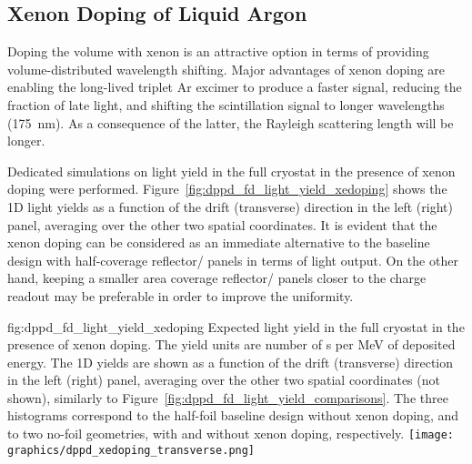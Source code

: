 \subsection{Xenon Doping of Liquid Argon}
\label{sec:dp-pds-appendix-xedoping}

Doping the  volume with xenon is an attractive option in terms of providing %
volume-distributed wavelength shifting. Major advantages of xenon doping are enabling the long-lived triplet Ar excimer to produce a faster signal, reducing the fraction of late light, and shifting the scintillation signal to longer wavelengths (\SI{175}{nm}). As a consequence of the latter, the Rayleigh scattering length will be longer.

Dedicated simulations on light yield in the full  cryostat in the presence of xenon doping were performed. Figure~\ref{fig:dppd_fd_light_yield_xedoping} shows the 1D light yields as a function of the drift (transverse) direction in the left (right) panel, averaging over the other two spatial coordinates. It is evident that the xenon doping can be considered as an immediate alternative to the baseline design with half-coverage reflector/ panels in terms of light output. On the other hand, keeping a smaller area coverage reflector/ panels closer to the charge readout may be preferable in order to improve the uniformity. 


\begin{dunefigure}{fig:dppd_fd_light_yield_xedoping}
{Expected light yield in the full   cryostat in the presence of xenon doping. The yield units are number of \phel{}s per \si{\MeV} of deposited energy. The 1D yields are shown as a function of the drift (transverse) direction in the left (right) panel, averaging over the other two spatial coordinates (not shown), similarly to Figure~\ref{fig:dppd_fd_light_yield_comparisons}. The three histograms correspond to the half-foil baseline design without xenon doping, and to two no-foil geometries, with and without xenon doping, respectively.}
 \hfill
\texttt{[image: graphics/dppd\_xedoping\_transverse.png]}
\end{dunefigure}